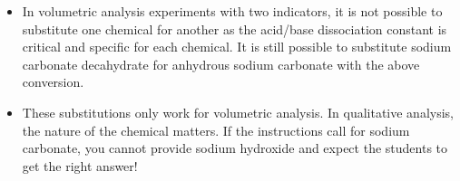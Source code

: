 \begin{itemize}

\item{In volumetric analysis experiments with two indicators, it is not possible to substitute one chemical for another as the acid/base dissociation constant is critical and specific for each chemical. It is still possible to substitute sodium carbonate decahydrate for anhydrous sodium carbonate with the above conversion.}

\item{These substitutions only work for volumetric analysis. In qualitative analysis, the nature of the chemical matters. If the instructions call for sodium carbonate, you cannot provide sodium hydroxide and expect the students to get the right answer!}

\end{itemize}
